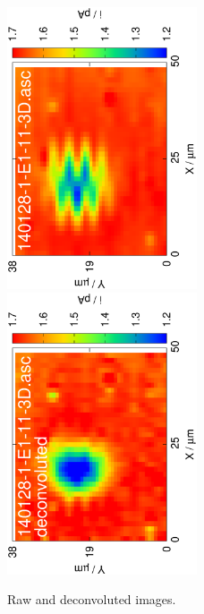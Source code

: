 \documentclass[a4paper, 11pt]{article}
\begin{document}
\begin{figure}
\centering
\includegraphics[width=0.5\textwidth, angle=-90]{11.eps}
\includegraphics[width=0.5\textwidth, angle=-90]{11_deconvoluted.eps}

\label{fig:results}
\caption{Raw and deconvoluted images.}
\end{figure}
\end{document}

